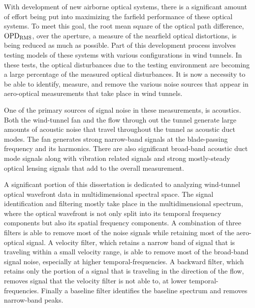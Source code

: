 
With development of new airborne optical systems, there is a significant amount of effort being put into maximizing the farfield performance of these optical systems.
To meet this goal, the root mean square of the optical path difference, $\operatorname{OPD_{RMS}}$, over the aperture, a measure of the nearfield optical distortions, is being reduced as much as possible.
Part of this development process involves testing models of these systems with various configurations in wind tunnels.
In these tests, the optical disturbances due to the testing environment are becoming a large percentage of the measured optical disturbances.
It is now a necessity to be able to identify, measure, and remove the various noise sources that appear in aero-optical measurements that take place in wind tunnels.

One of the primary sources of signal noise in these measurements, is acoustics.
Both the wind-tunnel fan and the flow through out the tunnel generate large amounts of acoustic noise that travel throughout the tunnel as acoustic duct modes.
The fan generates strong narrow-band signals at the blade-passing frequency and its harmonics.
There are also significant broad-band acoustic duct mode signals along with vibration related signals and strong mostly-steady optical lensing signals that add to the overall measurement.

A significant portion of this dissertation is dedicated to analyzing wind-tunnel optical wavefront data in multidimensional spectral space.
The signal identification and filtering mostly take place in the multidimensional spectrum, where the optical wavefront is not only split into its temporal frequency components but also its spatial frequency components.
A combination of three filters is able to remove most of the noise signals while retaining most of the aero-optical signal.
A velocity filter, which retains a narrow band of signal that is traveling within a small velocity range, is able to remove most of the broad-band signal noise, especially at higher temporal-frequencies.
A backward filter, which retains only the portion of a signal that is traveling in the direction of the flow, removes signal that the velocity filter is not able to, at lower temporal-frequencies.
Finally a baseline filter identifies the baseline spectrum and removes narrow-band peaks.
